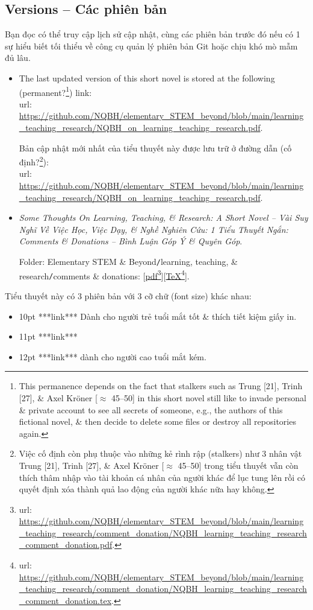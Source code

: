 \documentclass[12pt]{article}
\begin{document}
\subsection{Versions -- Các phiên bản}
Bạn đọc có thể truy cập lịch sử cập nhật, cùng các phiên bản trước đó nếu có 1 sự hiểu biết tối thiểu về công cụ quản lý phiên bản Git hoặc chịu khó mò mẫm đủ lâu.
\begin{itemize}
	\item The last updated version of this short novel is stored at the following (permanent?\footnote{This permanence depends on the fact that stalkers such as {\sf Trung [21], Trinh [27]}, \& {\sf Axel Kr\"oner [$\approx$ 45--50]} in this short novel still like to invade personal \& private account to see all secrets of someone, e.g., the authors of this fictional novel, \& then decide to delete some files or destroy all repositories again.}) link:\\{\sc url}: {\sf\small\url{https://github.com/NQBH/elementary_STEM_beyond/blob/main/learning_teaching_research/NQBH_on_learning_teaching_research.pdf}}.
	
	Bản cập nhật mới nhất của tiểu thuyết này được lưu trữ ở đường dẫn (cố định?\footnote{Việc cố định còn phụ thuộc vào những kẻ rình rập (stalkers) như 3 nhân vật {\sf Trung [21], Trinh [27]}, \& {\sf Axel Kr\"oner [$\approx$ 45--50]} trong tiểu thuyết vẫn còn thích thâm nhập vào tài khoản cá nhân của người khác để lục tung lên rồi có quyết định xóa thành quả lao động của người khác nữa hay không.}):\\{\sc url}: {\sf\small\url{https://github.com/NQBH/elementary_STEM_beyond/blob/main/learning_teaching_research/NQBH_on_learning_teaching_research.pdf}}.
	\item {\it Some Thoughts On Learning, Teaching, \& Research: A Short Novel -- Vài Suy Nghĩ Về Việc Học, Việc Dạy, \& Nghề Nghiên Cứu: 1 Tiểu Thuyết Ngắn: Comments \& Donations -- Bình Luận Góp Ý \& Quyên Góp}.
	
	Folder: {\sf Elementary STEM \& Beyond{\tt/}learning, teaching, \& research{\tt/}comments \& donations}: [\href{https://github.com/NQBH/elementary_STEM_beyond/blob/main/learning_teaching_research/comment_donation/NQBH_learning_teaching_research_comment_donation.pdf}{pdf}\footnote{{\sc url}: \url{https://github.com/NQBH/elementary_STEM_beyond/blob/main/learning_teaching_research/comment_donation/NQBH_learning_teaching_research_comment_donation.pdf}.}][\href{https://github.com/NQBH/elementary_STEM_beyond/blob/main/learning_teaching_research/comment_donation/NQBH_learning_teaching_research_comment_donation.tex}{\TeX}\footnote{{\sc url}: \url{https://github.com/NQBH/elementary_STEM_beyond/blob/main/learning_teaching_research/comment_donation/NQBH_learning_teaching_research_comment_donation.tex}.}].
\end{itemize}
Tiểu thuyết này có 3 phiên bản với 3 cỡ chữ (font size) khác nhau:
\begin{itemize}
	\item 10pt ***link*** Dành cho người trẻ tuổi mắt tốt \& thích tiết kiệm giấy in.
	\item 11pt ***link*** 
	\item 12pt ***link*** dành cho người cao tuổi mắt kém.
\end{itemize}
\end{document}
